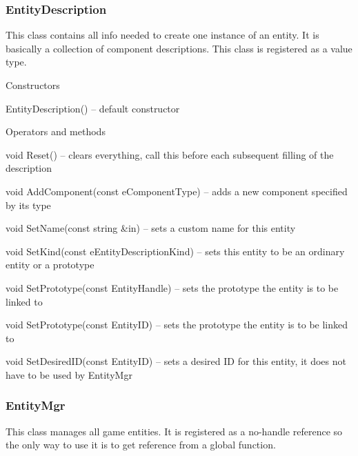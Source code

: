 \documentclass[12pt, a4paper]{article}
\newenvironment{titled-itemize}[1]
{
\vspace{5mm}
\noindent\textbf{#1}
\begin{itemize}
}
{
\end{itemize}
}
\begin{document}
\subsubsection{EntityDescription}

This class contains all info needed to create one instance of an entity. It is basically a collection of component descriptions. This class is registered as a value type.

\begin{titled-itemize}{Constructors}
  \item EntityDescription() -- default constructor
\end{titled-itemize}

\begin{titled-itemize}{Operators and methods}
  \item void Reset() -- clears everything, call this before each subsequent filling of the description
  \item void AddComponent(const eComponentType) -- adds a new component specified by its type
  \item void SetName(const string \&in) -- sets a custom name for this entity
  \item void SetKind(const eEntityDescriptionKind) -- sets this entity to be an ordinary entity or a prototype
  \item void SetPrototype(const EntityHandle) -- sets the prototype the entity is to be linked to
  \item void SetPrototype(const EntityID) -- sets the prototype the entity is to be linked to
  \item void SetDesiredID(const EntityID) -- sets a desired ID for this entity, it does not have to be used by EntityMgr
\end{titled-itemize}

\subsubsection{EntityMgr}

This class manages all game entities. It is registered as a no-handle reference so the only way to use it is to get reference from a global function.
\end{document}
